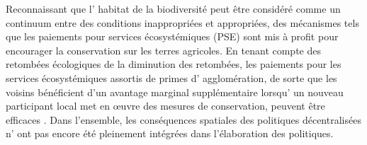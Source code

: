 \begin{displayquote}
\begin{displayquote}
\begin{displayquote}
{{Reconnaissant que l' habitat de la biodiversité peut être considéré comme un continuum entre des conditions inappropriées et appropriées, des mécanismes tels que les paiements pour services écosystémiques (PSE) sont mis à profit pour encourager la conservation sur les terres agricoles. En tenant compte des retombées écologiques de la diminution des retombées, les paiements pour les services écosystémiques assortis de primes d' agglomération, de sorte que les voisins bénéficient d'un avantage marginal supplémentaire lorsqu' un nouveau participant local met en œuvre des mesures de conservation, peuvent être efficaces \citep{parkhurst2002agglomeration, bareille_agglomeration_2023}. Dans l'ensemble, les conséquences spatiales des politiques décentralisées n' ont pas encore été pleinement intégrées dans l'élaboration des politiques.



}}
\end{displayquote}
\end{displayquote}
\end{displayquote}

